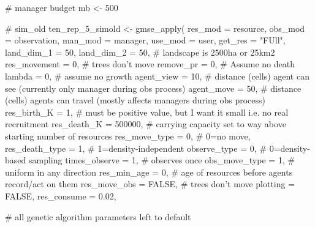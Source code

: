 \documentclass[
]{article}
\newenvironment{Shaded}{\begin{snugshade}}{\end{snugshade}}
\newcommand{\CommentTok}[1]{\textcolor[rgb]{0.50,0.62,0.50}{#1}}
\newcommand{\DataTypeTok}[1]{\textcolor[rgb]{0.87,0.87,0.75}{#1}}
\newcommand{\DecValTok}[1]{\textcolor[rgb]{0.86,0.86,0.80}{#1}}
\newcommand{\FloatTok}[1]{\textcolor[rgb]{0.75,0.75,0.82}{#1}}
\newcommand{\KeywordTok}[1]{\textcolor[rgb]{0.94,0.87,0.69}{#1}}
\newcommand{\NormalTok}[1]{\textcolor[rgb]{0.80,0.80,0.80}{#1}}
\newcommand{\OtherTok}[1]{\textcolor[rgb]{0.94,0.94,0.56}{#1}}
\newcommand{\StringTok}[1]{\textcolor[rgb]{0.80,0.58,0.58}{#1}}
\begin{document}
\begin{Shaded}
\begin{Highlighting}[]
\CommentTok{# manager budget}
\NormalTok{mb <-}\StringTok{ }\DecValTok{500}

\CommentTok{# sim_old}
\NormalTok{ten_rep_}\DecValTok{5}\NormalTok{_simold <-}\StringTok{ }\KeywordTok{gmse_apply}\NormalTok{(}
  \DataTypeTok{res_mod =}\NormalTok{ resource,}
  \DataTypeTok{obs_mod =}\NormalTok{ observation,}
  \DataTypeTok{man_mod =}\NormalTok{ manager,}
  \DataTypeTok{use_mod =}\NormalTok{ user,}
  \DataTypeTok{get_res =} \StringTok{"FUll"}\NormalTok{,}
  \DataTypeTok{land_dim_1 =} \DecValTok{50}\NormalTok{,}
  \DataTypeTok{land_dim_2 =} \DecValTok{50}\NormalTok{, }\CommentTok{# landscape is 2500ha or 25km2}
  \DataTypeTok{res_movement =} \DecValTok{0}\NormalTok{, }\CommentTok{# trees don't move }
  \DataTypeTok{remove_pr =} \DecValTok{0}\NormalTok{, }\CommentTok{# Assume no death }
  \DataTypeTok{lambda =} \DecValTok{0}\NormalTok{, }\CommentTok{# assume no growth}
  \DataTypeTok{agent_view =} \DecValTok{10}\NormalTok{, }\CommentTok{# distance (cells) agent can see (currently only manager during obs process)}
  \DataTypeTok{agent_move =} \DecValTok{50}\NormalTok{, }\CommentTok{# distance (cells) agents can travel (mostly affects managers during obs process)}
  \DataTypeTok{res_birth_K =} \DecValTok{1}\NormalTok{, }\CommentTok{# must be positive value, but I want it small i.e. no real recruitment}
  \DataTypeTok{res_death_K =} \DecValTok{500000}\NormalTok{, }\CommentTok{# carrying capacity set to way above starting number of resources}
  \DataTypeTok{res_move_type =} \DecValTok{0}\NormalTok{, }\CommentTok{# 0=no move, }
  \DataTypeTok{res_death_type =} \DecValTok{1}\NormalTok{, }\CommentTok{# 1=density-independent }
  \DataTypeTok{observe_type =} \DecValTok{0}\NormalTok{, }\CommentTok{# 0=density-based sampling }
  \DataTypeTok{times_observe =} \DecValTok{1}\NormalTok{, }\CommentTok{# observes once}
  \DataTypeTok{obs_move_type =} \DecValTok{1}\NormalTok{, }\CommentTok{# uniform in any direction}
  \DataTypeTok{res_min_age =} \DecValTok{0}\NormalTok{, }\CommentTok{# age of resources before agents record/act on them}
  \DataTypeTok{res_move_obs =} \OtherTok{FALSE}\NormalTok{, }\CommentTok{# trees don't move}
  \DataTypeTok{plotting =} \OtherTok{FALSE}\NormalTok{, }
  \DataTypeTok{res_consume =} \FloatTok{0.02}\NormalTok{, }
  
  \CommentTok{# all genetic algorithm parameters left to default}
  

\end{Highlighting}
\end{Shaded}
\end{document}
